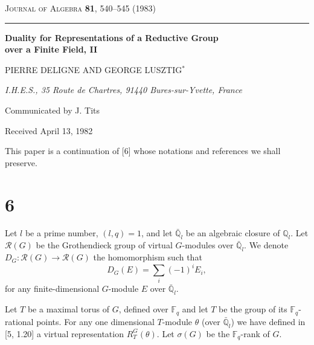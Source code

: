 \documentclass[12pt,a4paper]{article}
\theoremstyle{plain}
\theoremstyle{remark}
\newcommand{\sR}{\mathcal{R}}
\begin{document}
\begin{center}
{\large\scshape Journal of Algebra \textbf{81}, 540--545 (1983)}
\end{center}

\begin{center}
\rule{0.8\textwidth}{0.4pt}
\end{center}

\begin{center}
{\LARGE\bfseries Duality for Representations of a Reductive Group\\[0.3em] over a Finite Field, II}
\end{center}

\vspace{0.5em}

\begin{center}
{\large PIERRE DELIGNE AND GEORGE LUSZTIG$^*$}
\end{center}

\begin{center}
\textit{I.H.E.S., 35 Route de Chartres, 91440 Bures-sur-Yvette, France}
\end{center}

\begin{center}
Communicated by J. Tits
\end{center}

\begin{center}
Received April 13, 1982
\end{center}

\vspace{0.5em}

\noindent
This paper is a continuation of [6] whose notations and references we shall preserve.

\section*{6}

Let $l$ be a prime number, $(l,q)=1$, and let $\bar{\mathbb{Q}}_l$ be an algebraic closure of $\mathbb{Q}_l$. Let $\sR(G)$ be the Grothendieck group of virtual $G$-modules over $\bar{\mathbb{Q}}_l$. We denote $D_G \colon \sR(G) \to \sR(G)$ the homomorphism such that
\begin{equation*}
D_G(E) = \sum_i (-1)^i E_i,
\end{equation*}
for any finite-dimensional $G$-module $E$ over $\bar{\mathbb{Q}}_l$.

Let $T$ be a maximal torus of $G$, defined over $\mathbb{F}_q$ and let $T$ be the group of its $\mathbb{F}_q$-rational points. For any one dimensional $T$-module $\theta$ (over $\bar{\mathbb{Q}}_l$) we have defined in [5, 1.20] a virtual representation $R_T^G(\theta)$. Let $\sigma(G)$ be the $\mathbb{F}_q$-rank of $G$.
\end{document}
